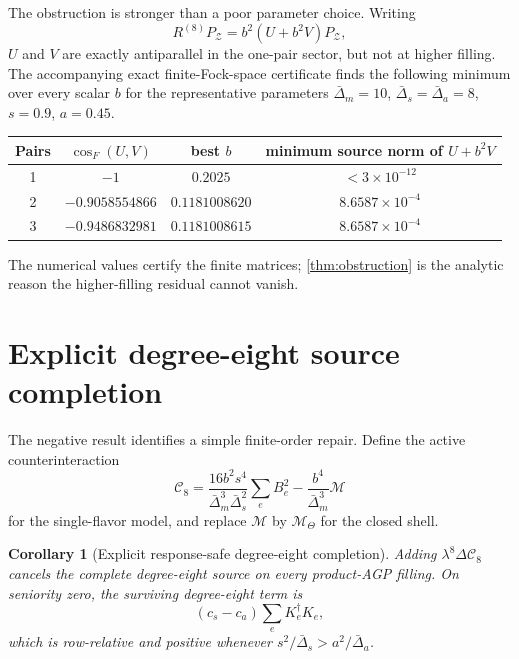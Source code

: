 \documentclass[11pt]{article}
\newtheorem{corollary}[theorem]{Corollary}
\theoremstyle{definition}
\theoremstyle{remark}
\newcommand{\cZ}{\mathcal Z}
\newcommand{\cM}{\mathcal M}
\newcommand{\cC}{\mathcal C}
\begin{document}
The obstruction is stronger than a poor parameter choice.  Writing
\begin{equation}
 R^{(8)}P_{\cZ}=b^2(U+b^2V)P_{\cZ},
 \label{eq:UV}
\end{equation}
$U$ and $V$ are exactly antiparallel in the one-pair sector, but not at higher filling.  The accompanying exact finite-Fock-space certificate finds the following minimum over every scalar $b$ for the representative parameters $\bar\Delta_m=10$, $\bar\Delta_s=\bar\Delta_a=8$, $s=0.9$, $a=0.45$.

\begin{center}
\begin{tabular}{@{}cccc@{}}
\toprule
Pairs & $\cos_F(U,V)$ & best $b$ & minimum source norm of $U+b^2V$\\
\midrule
1 & $-1$ & $0.2025$ & $<3\times10^{-12}$\\
2 & $-0.9058554866$ & $0.1181008620$ & $8.6587\times10^{-4}$\\
3 & $-0.9486832981$ & $0.1181008615$ & $8.6587\times10^{-4}$\\
\bottomrule
\end{tabular}
\end{center}
The numerical values certify the finite matrices; \cref{thm:obstruction} is the analytic reason the higher-filling residual cannot vanish.

\section{Explicit degree-eight source completion}

The negative result identifies a simple finite-order repair.  Define the active counterinteraction
\begin{equation}
 \cC_8=
 \frac{16b^2s^4}{\bar\Delta_m^3\bar\Delta_s^2}\sum_eB_e^2
 -\frac{b^4}{\bar\Delta_m^3}\cM
 \label{eq:C8}
\end{equation}
for the single-flavor model, and replace $\cM$ by $\cM_\Theta$ for the closed shell.

\begin{corollary}[Explicit response-safe degree-eight completion]
\label{cor:C8}
Adding $\lambda^8\Delta\cC_8$ cancels the complete degree-eight source on every product-AGP filling.  On seniority zero, the surviving degree-eight term is
\begin{equation}
 (c_s-c_a)\sum_eK_e^\dagger K_e,
 \label{eq:safe-K-shift}
\end{equation}
which is row-relative and positive whenever
$s^2/\bar\Delta_s>a^2/\bar\Delta_a$.
\end{corollary}
\end{document}
